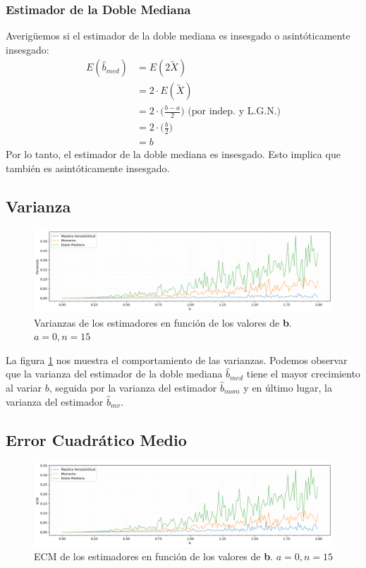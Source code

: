 \subsubsection{Estimador de la Doble Mediana}
Averigüemos si el estimador de la doble mediana es insesgado o asintóticamente insesgado:
\begin{align*}
	E(\hat{b}_{med}) &= E(2\tilde{X}) \\
	 	 			 &= 2 \cdot E(\tilde{X}) \\
	 	 			 &= 2 \cdot \Big(\frac{b - a}{2}\Big) \text{ (por indep. y L.G.N.)}\\
	 	 			 &= 2 \cdot \Big(\frac{b}{2}\Big) \\
	 	 			 &= b
\end{align*}
Por lo tanto, el estimador de la doble mediana es insesgado. Esto implica que también es asintóticamente insesgado.

\subsection{Varianza}
\begin{figure}[H]
	\centering
	\includegraphics[width=1\textwidth]{imagenes/varianzas.png}
	\caption{\footnotesize Varianzas de los estimadores en función de los valores de \textbf{b}. $a=0, n=15$}
	\label{fig:ej6-varianzas}
\end{figure}

La figura \ref{fig:ej6-varianzas} nos muestra el comportamiento de las varianzas. Podemos observar que la varianza del estimador de la doble mediana $\hat{b}_{med}$ tiene el mayor crecimiento al variar $b$, seguida por la varianza del estimador $\hat{b}_{mom}$ y en último lugar, la varianza del estimador $\hat{b}_{mv}$.

\subsection{Error Cuadrático Medio}
\begin{figure}[H]
	\centering
	\includegraphics[width=1\textwidth]{imagenes/ecm.png}
	\caption{\footnotesize ECM de los estimadores en función de los valores de \textbf{b}. $a=0, n=15$}
	\label{fig:ej6-ecm}
\end{figure}


